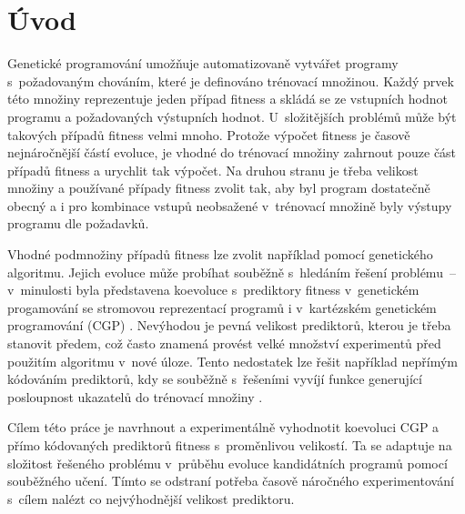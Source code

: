 \documentclass[czech]{ExcelAtFIT} %
\affiliation{*%
    \href{mailto:xwigla00@stud.fit.vutbr.cz}{xwigla00@stud.fit.vutbr.cz},
    \textit{Fakulta informačních technologií, Vysoké učení technické v~Brně}}
\begin{document}
\startdocument



\section{Úvod}

Genetické programování umožňuje automatizovaně vytvářet programy s~požadovaným chováním, které je definováno trénovací množinou. Každý prvek této množiny reprezentuje jeden případ fitness a skládá se ze vstupních hodnot programu a po\-ža\-do\-va\-ných vý\-stup\-ních hodnot. U~složitějších problémů může být ta\-ko\-vých případů fitness velmi mnoho. Protože vý\-po\-čet fitness je časově nejnáročnější částí evoluce, je vhodné do trénovací množiny zahrnout pouze část případů fitness a urychlit tak výpočet. Na druhou stranu je třeba velikost množiny a používané případy fitness zvolit tak, aby byl program dostatečně obecný a i pro kombinace vstupů neobsažené v~trénovací množině byly výstupy programu dle požadavků.

Vhodné podmnožiny případů fitness lze zvolit na\-příklad pomocí genetického algoritmu. Jejich evoluce může probíhat souběžně s~hledáním řešení prob\-lému~-- v~minulosti byla představena ko\-evo\-luce s~pre\-dik\-tory fitness v~genetickém progamování se stromovou re\-pre\-zen\-tací programů \cite{Schmidt} i v~kartézském genetickém pro\-gra\-mo\-vání (CGP) \cite{SikuEuroGP}. Nevýhodou je pevná velikost prediktorů, kterou je třeba stanovit předem, což často znamená provést velké množství experimentů před použitím algoritmu v~nové úloze. Tento nedostatek lze řešit například nepřímým kódováním prediktorů, kdy se souběžně s~řešeními vyvíjí funkce generující posloupnost ukazatelů do trénovací množiny \cite{SikuHulva}.

Cílem této práce je navrhnout a experimentálně vyhodnotit koevoluci CGP a přímo kódovaných prediktorů fitness s~proměnlivou velikostí. Ta se adaptuje na složitost řešeného problému v~průběhu evoluce kandidátních programů pomocí souběžného učení. Tímto se odstraní potřeba časově náročného experimentování s~cílem nalézt co nejvýhodnější velikost prediktoru.
\end{document}
